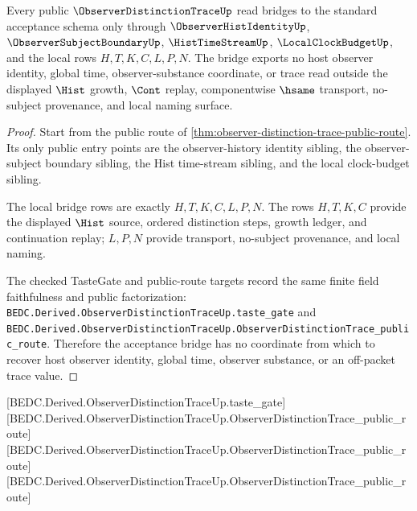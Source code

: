 \begin{theorem}
\label{thm:observer-distinction-trace-bridge-surface}
Every public $\ObserverDistinctionTraceUp$ read bridges to the standard acceptance schema only through $\ObserverHistIdentityUp$, $\ObserverSubjectBoundaryUp$, $\HistTimeStreamUp$, $\LocalClockBudgetUp$, and the local rows $H,T,K,C,L,P,N$. The bridge exports no host observer identity, global time, observer-substance coordinate, or trace read outside the displayed $\Hist$ growth, $\Cont$ replay, componentwise $\hsame$ transport, no-subject provenance, and local naming surface.
\end{theorem}
\begin{proof}
Start from the public route of \autoref{thm:observer-distinction-trace-public-route}. Its only public entry points are the observer-history identity sibling, the observer-subject boundary sibling, the Hist time-stream sibling, and the local clock-budget sibling.

The local bridge rows are exactly $H,T,K,C,L,P,N$. The rows $H,T,K,C$ provide the displayed $\Hist$ source, ordered distinction steps, growth ledger, and continuation replay; $L,P,N$ provide transport, no-subject provenance, and local naming.

The checked TasteGate and public-route targets record the same finite field faithfulness and public factorization:
\texttt{BEDC.Derived.ObserverDistinctionTraceUp.taste\_gate} and \texttt{BEDC.Derived.ObserverDistinctionTraceUp.ObserverDistinctionTrace\_public\_route}. Therefore the acceptance bridge has no coordinate from which to recover host observer identity, global time, observer substance, or an off-packet trace value.
\end{proof}



[BEDC.Derived.ObserverDistinctionTraceUp.taste\_gate]
[BEDC.Derived.ObserverDistinctionTraceUp.ObserverDistinctionTrace\_public\_route]
[BEDC.Derived.ObserverDistinctionTraceUp.ObserverDistinctionTrace\_public\_route]
[BEDC.Derived.ObserverDistinctionTraceUp.ObserverDistinctionTrace\_public\_route]

